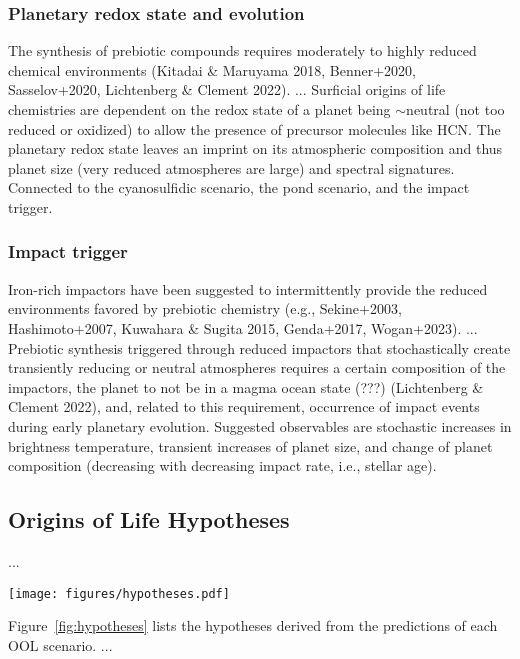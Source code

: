 \documentclass[modern,linenumbers]{aastex631}
\begin{document}
\subsubsection{Planetary redox state and evolution}
The synthesis of prebiotic compounds requires moderately to highly reduced chemical environments (Kitadai \& Maruyama 2018, Benner+2020, Sasselov+2020, Lichtenberg \& Clement 2022).
...
Surficial origins of life chemistries are dependent on the redox state of a planet being $\sim$neutral (not too reduced or oxidized) to allow the presence of precursor molecules like HCN. The planetary redox state leaves an imprint on its atmospheric composition and thus planet size (very reduced atmospheres are large) and spectral signatures. Connected to the cyanosulfidic scenario, the pond scenario, and the impact trigger.

\subsubsection{Impact trigger}
Iron-rich impactors have been suggested to intermittently provide the reduced environments favored by prebiotic chemistry (e.g., Sekine+2003, Hashimoto+2007, Kuwahara \& Sugita 2015, Genda+2017, Wogan+2023).
...
Prebiotic synthesis triggered through reduced impactors that stochastically create transiently reducing or neutral atmospheres requires a certain composition of the impactors, the planet to not be in a magma ocean state (???) (Lichtenberg \& Clement 2022), and, related to this requirement, occurrence of impact events during early planetary evolution.
Suggested observables are stochastic increases in brightness temperature, transient increases of planet size, and change of planet composition (decreasing with decreasing impact rate, i.e., stellar age).


%

\subsection{Origins of Life Hypotheses}
...
\begin{figure*}
    \begin{centering}
        \texttt{[image: figures/hypotheses.pdf]}
        \caption{Origins of Life scenarios, their predictions on exoplanet observables, and derived population-level hypotheses.}
        \label{fig:hypotheses}
    \end{centering}
\end{figure*}
Figure~\ref{fig:hypotheses} lists the hypotheses derived from the predictions of each OOL scenario.
...
\end{document}
